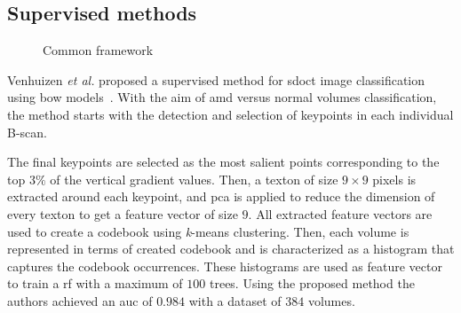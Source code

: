 \subsection{Supervised methods}

\begin{figure}
  \caption{Common framework}
  \label{fig:ML-scheme}
\end{figure}

Venhuizen \textit{et al.} proposed a supervised method for \gls{sdoct} image classification using \gls{bow} models~\cite{Venhuizen2015}.
With the aim of \gls{amd} versus normal volumes classification, the method starts with the detection and selection of keypoints in each individual B-scan. %

The final keypoints are selected as the most salient points corresponding to the top $3 \%$ of the vertical gradient values.
Then, a texton of size $9 \times 9$ pixels is extracted around each keypoint, and \gls{pca} is applied to reduce the dimension of every texton to get a feature vector of size $9$.
All extracted feature vectors are used to create a codebook using \textit{k}-means clustering.
Then, each volume is represented in terms of created codebook and is characterized as a histogram that captures the codebook occurrences.
These histograms are used as feature vector to train a \gls{rf} with a maximum of $100$ trees.
Using the proposed method the authors achieved an \gls{auc} of $0.984$ with a dataset of $384$ volumes.


